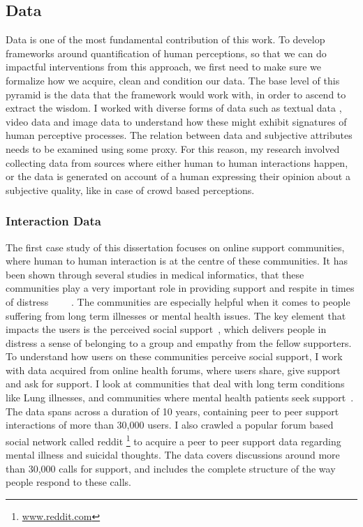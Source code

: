 \subsection{Data}
Data is one of the most fundamental contribution of this work. To develop frameworks around quantification of human perceptions, so that we can do impactful interventions from this approach, we first need to make sure we formalize how we acquire, clean and condition our data. The base level of this pyramid is the data that the framework would work with, in order to ascend to extract the wisdom. I worked with diverse forms of data such as textual data , video data and image data to understand how these might exhibit signatures of human perceptive processes. The relation between data and subjective attributes needs to be examined using some proxy. For this reason, my research involved collecting data from sources where either human to human interactions happen, or the data is generated on account of a human expressing their opinion about a subjective quality, like in case of crowd based perceptions.

\subsubsection{Interaction Data}
The first case study of this dissertation focuses on online support communities, where human to human interaction is at the centre of these communities. It has been shown through several studies in medical informatics, that these communities play a very important role in providing support and respite in times of distress~\cite{allen2016long}~\cite{mo2012developing,pendry2015individual} ~\cite{bartlett2011investigation,izuka2017stroke}~\cite{hobbs2016online}. The communities are especially helpful when it comes to people suffering from long term illnesses or mental health issues.
The key element that impacts the users is the perceived social support~\cite{nambisan2011information}, which delivers people in distress a sense of belonging to a group and empathy from the fellow supporters. 
To understand how users on these communities perceive social support, I work with data acquired from online health forums, where users share, give support and ask for support. I look at communities that deal with long term conditions like Lung illnesses, and communities where mental health patients seek support~\cite{joglekar2018online}. The data spans across a duration of 10 years, containing peer to peer support interactions of more than 30,000 users. I also crawled a popular forum based social network called reddit \footnote{\url{www.reddit.com}} to acquire a peer to peer support data regarding mental illness and suicidal thoughts. The data covers discussions around  more than 30,000 calls for support, and includes the complete structure of the way people respond to these calls. 

